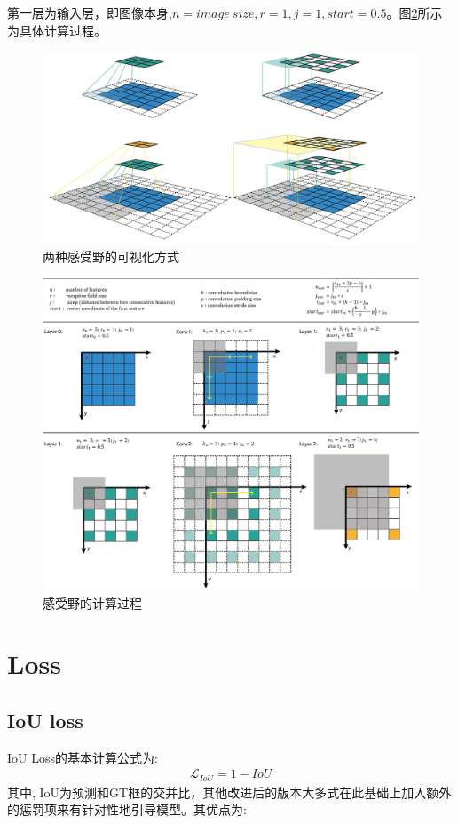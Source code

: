 \documentclass{article}
\begin{document}
第一层为输入层，即图像本身,$n= image\ size, r=1,j=1, start=0.5$。图\ref{Fig.receptive_field_calc}所示为具体计算过程。

\begin{figure}
\centering
\includegraphics[scale=0.2]{images/receptive_field.png}
\caption{两种感受野的可视化方式}
\label{Fig.receptive_field}
\end{figure}

\begin{figure}
\centering
\includegraphics[scale=0.2]{images/receptive_field_calculation.png}
\caption{感受野的计算过程}
\label{Fig.receptive_field_calc}
\end{figure}


\section{Loss}
\subsection{IoU loss}
IoU Loss的基本计算公式为:
\begin{align}
\mathcal{L}_{IoU} = 1 - IoU
\end{align}
其中, IoU为预测和GT框的交并比，其他改进后的版本大多式在此基础上加入额外的惩罚项来有针对性地引导模型。其优点为:
\end{document}
